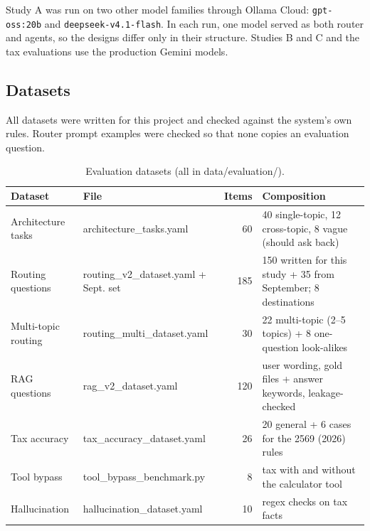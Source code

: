 \documentclass[11pt,a4paper]{article}
\begin{document}
Study A was run on two other model families through Ollama Cloud: \texttt{gpt-oss:20b} and \texttt{deepseek-v4.1-flash}. In each run, one model served as both router and agents, so the designs differ only in their structure. Studies B and C and the tax evaluations use the production Gemini models.

\subsection{Datasets}
All datasets were written for this project and checked against the system's own rules. Router prompt examples were checked so that none copies an evaluation question.

\begin{table}[H]
\centering
\footnotesize
\caption{Evaluation datasets (all in data/evaluation/).}\label{tab:datasets}
\begin{tabular}{llrp{6.6cm}}
\toprule
\textbf{Dataset} & \textbf{File} & \textbf{Items} & \textbf{Composition} \\
\midrule
Architecture tasks & architecture\_\allowbreak{}tasks.yaml & 60 & 40 single-topic, 12 cross-topic, 8 vague (should ask back) \\
Routing questions & routing\_\allowbreak{}v2\_\allowbreak{}dataset.yaml + Sept. set & 185 & 150 written for this study + 35 from September; 8 destinations \\
Multi-topic routing & routing\_\allowbreak{}multi\_\allowbreak{}dataset.yaml & 30 & 22 multi-topic (2--5 topics) + 8 one-question look-alikes \\
RAG questions & rag\_\allowbreak{}v2\_\allowbreak{}dataset.yaml & 120 & user wording, gold files + answer keywords, leakage-checked \\
Tax accuracy & tax\_\allowbreak{}accuracy\_\allowbreak{}dataset.yaml & 26 & 20 general + 6 cases for the 2569 (2026) rules \\
Tool bypass & tool\_\allowbreak{}bypass\_\allowbreak{}benchmark.py & 8 & tax with and without the calculator tool \\
Hallucination & hallucination\_\allowbreak{}dataset.yaml & 10 & regex checks on tax facts \\
\bottomrule
\end{tabular}
\end{table}
\end{document}
